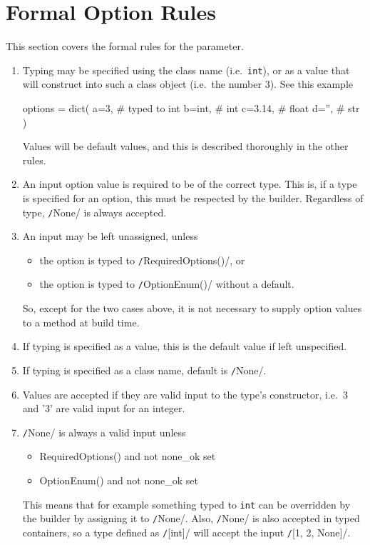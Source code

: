 \section{Formal Option Rules}
\label{sec:formal_options}
This section covers the formal rules for the \options parameter.
\begin{enumerate}

\item Typing may be specified using the class name (i.e.\ \texttt{int}), or as
  a value that will construct into such a class object (i.e.\ the
  number 3).  See this example
  \begin{python}
options = dict(
    a=3,     # typed to int
    b=int,   #          int
    c=3.14,  #          float
    d='',    #          str
)
  \end{python}
  Values will be default values, and this is described thoroughly in
  the other rules.

 \item An input option value is required to be of the correct type.
   This is, if a type is specified for an option, this must be
   respected by the builder.  Regardless of type,
   \texttt/None/ is always accepted.

\item An input may be left unassigned, unless
  \begin{itemize}
  \item the option is typed to \texttt/RequiredOptions()/, or
  \item the option is typed to \texttt/OptionEnum()/ without a default.
  \end{itemize}
  So, except for the two cases above, it is not necessary to supply
  option values to a method at build time.

\item If typing is specified as a value, this is the default value if
  left unspecified.

\item If typing is specified as a class name, default is
  \texttt/None/.

\item Values are accepted if they are valid input to the type's
  constructor, i.e.\ 3 and '3' are valid input for an integer.

\item \texttt/None/ is always a valid input unless
  \begin{itemize}
  \item RequiredOptions() and not none\_ok set
  \item OptionEnum() and not none\_ok set
  \end{itemize}
  This means that for example something typed to \texttt{int} can be
  overridden by the builder by assigning it to
  \texttt/None/.  Also, \texttt/None/ is also
  accepted in typed containers, so a type defined as
  \texttt/[int]/ will accept the input
  \texttt/[1, 2, None]/.


\end{enumerate}
